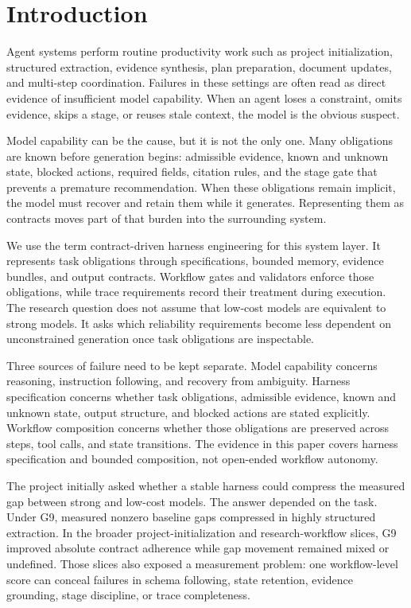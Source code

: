 \documentclass[11pt]{article}
\begin{document}
\section{Introduction}

Agent systems perform routine productivity work such as project initialization, structured extraction, evidence synthesis, plan preparation, document updates, and multi-step coordination. Failures in these settings are often read as direct evidence of insufficient model capability. When an agent loses a constraint, omits evidence, skips a stage, or reuses stale context, the model is the obvious suspect.

Model capability can be the cause, but it is not the only one. Many obligations are known before generation begins: admissible evidence, known and unknown state, blocked actions, required fields, citation rules, and the stage gate that prevents a premature recommendation. When these obligations remain implicit, the model must recover and retain them while it generates. Representing them as contracts moves part of that burden into the surrounding system.

We use the term contract-driven harness engineering for this system layer. It represents task obligations through specifications, bounded memory, evidence bundles, and output contracts. Workflow gates and validators enforce those obligations, while trace requirements record their treatment during execution. The research question does not assume that low-cost models are equivalent to strong models. It asks which reliability requirements become less dependent on unconstrained generation once task obligations are inspectable.

Three sources of failure need to be kept separate. Model capability concerns reasoning, instruction following, and recovery from ambiguity. Harness specification concerns whether task obligations, admissible evidence, known and unknown state, output structure, and blocked actions are stated explicitly. Workflow composition concerns whether those obligations are preserved across steps, tool calls, and state transitions. The evidence in this paper covers harness specification and bounded composition, not open-ended workflow autonomy.

The project initially asked whether a stable harness could compress the measured gap between strong and low-cost models. The answer depended on the task. Under G9, measured nonzero baseline gaps compressed in highly structured extraction. In the broader project-initialization and research-workflow slices, G9 improved absolute contract adherence while gap movement remained mixed or undefined. Those slices also exposed a measurement problem: one workflow-level score can conceal failures in schema following, state retention, evidence grounding, stage discipline, or trace completeness.
\end{document}
